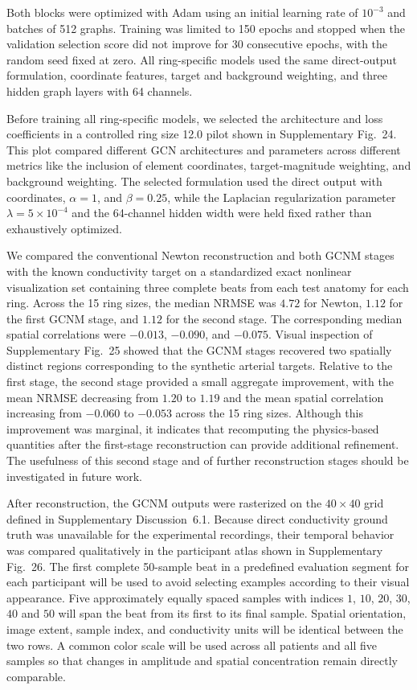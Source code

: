 \documentclass[11pt]{article}
\begin{document}
Both blocks were optimized with Adam using an initial learning rate of $10^{-3}$ and batches of 512 graphs.
Training was limited to 150 epochs and stopped when the validation selection score did not improve for 30 consecutive epochs, with the random seed fixed at zero.
All ring-specific models used the same direct-output formulation, coordinate features, target and background weighting, and three hidden graph layers with 64 channels.

Before training all ring-specific models, we selected the architecture and loss coefficients in a controlled ring size 12.0 pilot shown in Supplementary Fig.~24.
This plot compared different GCN architectures and parameters across different metrics like the inclusion of element coordinates, target-magnitude weighting, and background weighting.
The selected formulation used the direct output with coordinates, $\alpha=1$, and $\beta=0.25$, while the Laplacian regularization parameter $\lambda=5\times10^{-4}$ and the 64-channel hidden width were held fixed rather than exhaustively optimized.

We compared the conventional Newton reconstruction and both GCNM stages with the known conductivity target on a standardized exact nonlinear visualization set containing three complete beats from each test anatomy for each ring.
Across the 15 ring sizes, the median NRMSE was $4.72$ for Newton, $1.12$ for the first GCNM stage, and $1.12$ for the second stage.
The corresponding median spatial correlations were $-0.013$, $-0.090$, and $-0.075$.
Visual inspection of Supplementary Fig.~25 showed that the GCNM stages recovered two spatially distinct regions corresponding to the synthetic arterial targets.
Relative to the first stage, the second stage provided a small aggregate improvement, with the mean NRMSE decreasing from $1.20$ to $1.19$ and the mean spatial correlation increasing from $-0.060$ to $-0.053$ across the 15 ring sizes.
Although this improvement was marginal, it indicates that recomputing the physics-based quantities after the first-stage reconstruction can provide additional refinement.
The usefulness of this second stage and of further reconstruction stages should be investigated in future work.

After reconstruction, the GCNM outputs were rasterized on the $40\times40$ grid defined in Supplementary Discussion~6.1.
Because direct conductivity ground truth was unavailable for the experimental recordings, their temporal behavior was compared qualitatively in the participant atlas shown in Supplementary Fig.~26.
The first complete 50-sample beat in a predefined evaluation segment for each participant will be used to avoid selecting examples according to their visual appearance.
Five approximately equally spaced samples with indices $1$, $10$, $20$, $30$, $40$ and $50$ will span the beat from its first to its final sample.
Spatial orientation, image extent, sample index, and conductivity units will be identical between the two rows.
A common color scale will be used across all patients and all five samples so that changes in amplitude and spatial concentration remain directly comparable.
\end{document}
